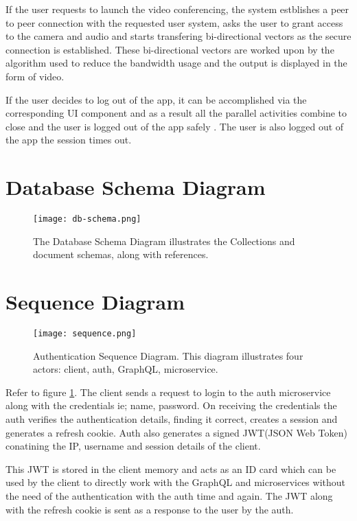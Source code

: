 If the user requests to launch the video conferencing, the system estblishes a peer to peer connection with the requested user system, asks the user to grant access to the camera and audio and starts transfering bi-directional vectors as the secure connection is established.
These bi-directional vectors are worked upon by the algorithm used to reduce the bandwidth usage and the output is displayed in the form of video.

If the user decides to log out of the app, it can be accomplished via the corresponding UI component and as a result all the parallel activities combine to close and the user is logged out of the app safely .
The user is also logged out of the app the session times out.

\section{Database Schema Diagram}

\begin{figure}[h!]
    \centering
    \texttt{[image: db-schema.png]}
    \caption{The Database Schema Diagram illustrates the Collections and document schemas, along with references.}
\end{figure}

\section{Sequence Diagram}

\begin{figure}[h!]
    \begin{center}
        \texttt{[image: sequence.png]}
    \end{center}
    \caption{Authentication Sequence Diagram. This diagram illustrates four actors: client, auth, GraphQL, microservice.}
    \label{fig:sequence}
\end{figure}

Refer to figure \ref{fig:sequence}.
The client sends a request to login to the auth microservice along with the credentials ie; name, password.
On receiving the credentials the auth verifies the authentication details, finding it correct, creates a session and generates a refresh cookie.
Auth also generates a signed JWT(JSON Web Token) conatining the IP, username and session details of the client.

This JWT is stored in the client memory and acts as an ID card which can be used by 
the client to directly work with the GraphQL and microservices without the need of 
the authentication with the auth time and again.
The JWT along with the refresh cookie is sent as a response to the user by the auth.

